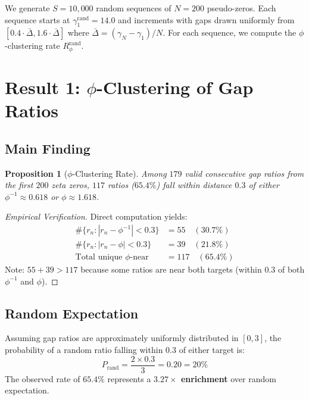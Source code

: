 \documentclass[11pt,a4paper]{article}
\newtheorem{proposition}[theorem]{Proposition}
\begin{document}
We generate $S = 10{,}000$ random sequences of $N = 200$ pseudo-zeros. Each sequence starts at $\gamma_1^{\text{rand}} = 14.0$ and increments with gaps drawn uniformly from $[0.4 \cdot \bar{\Delta}, 1.6 \cdot \bar{\Delta}]$ where $\bar{\Delta} = (\gamma_N - \gamma_1)/N$. For each sequence, we compute the $\phi$-clustering rate $R_{\phi}^{\text{rand}}$.

\newpage

\section{Result 1: $\phi$-Clustering of Gap Ratios}
\label{sec:clustering}

\subsection{Main Finding}

\begin{proposition}[$\phi$-Clustering Rate]
\label{prop:main}
Among $179$ valid consecutive gap ratios from the first $200$ zeta zeros, $117$ ratios ($65.4\%$) fall within distance $0.3$ of either $\phi^{-1} \approx 0.618$ or $\phi \approx 1.618$.
\end{proposition}

\begin{proof}[Empirical Verification]
Direct computation yields:
\begin{align*}
\#\{r_n : |r_n - \phi^{-1}| < 0.3\} &= 55 \quad (30.7\%) \\
\#\{r_n : |r_n - \phi| < 0.3\} &= 39 \quad (21.8\%) \\
\text{Total unique $\phi$-near} &= 117 \quad (65.4\%)
\end{align*}
Note: $55 + 39 > 117$ because some ratios are near both targets (within $0.3$ of both $\phi^{-1}$ and $\phi$).
\end{proof}

\subsection{Random Expectation}

Assuming gap ratios are approximately uniformly distributed in $[0, 3]$, the probability of a random ratio falling within $0.3$ of either target is:
\begin{equation}
P_{\text{rand}} = \frac{2 \times 0.3}{3} = 0.20 = 20\%
\end{equation}
The observed rate of $65.4\%$ represents a \textbf{$3.27\times$ enrichment} over random expectation.
\end{document}
